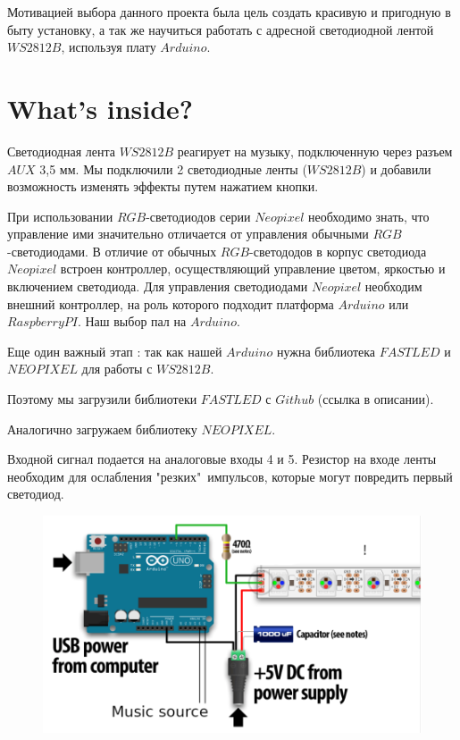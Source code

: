 \documentclass[a4paper, 12pt]{article}%
\begin{document}
Мотивацией выбора данного проекта была цель создать красивую и пригодную в быту установку, а так же научиться работать с адресной светодиодной лентой $WS2812B$, используя плату $Arduino$.


\section{What's inside?}

Светодиодная лента $WS2812B$ реагирует на музыку, подключенную через разъем $AUX$ 3,5 мм. Мы подключили 2 светодиодные ленты ($WS2812B$) и добавили возможность изменять эффекты путем нажатием кнопки.

При использовании $RGB$-светодиодов серии $Neopixel$ необходимо знать, что управление ими значительно отличается от управления обычными $RGB$-светодиодами. В отличие от обычных $RGB$-светододов в корпус светодиода $Neopixel$ встроен контроллер, осуществляющий управление цветом, яркостью и включением светодиода.
Для управления светодиодами $Neopixel$ необходим внешний контроллер, на роль которого подходит платформа $Arduino $ или $Raspberry PI$. Наш выбор пал на $Arduino$.


Еще один важный этап : так как нашей $Arduino$ нужна библиотека $FAST LED$ и $NEOPIXEL$ для работы с $WS2812B$.

Поэтому мы загрузили библиотеки $FAST LED$ с $Github$ (ссылка в описании).

Аналогично загружаем библиотеку $NEOPIXEL$. 

Входной сигнал подается на аналоговые входы 4 и 5. Резистор на входе ленты необходим для ослабления "резких"\ импульсов, которые могут повредить первый светодиод.

\newpage

\begin{figure}[!h]
\begin{center}
\includegraphics[scale=0.5]{pictures/scheme.png}
\end{center}
\end{figure}
\end{document}
